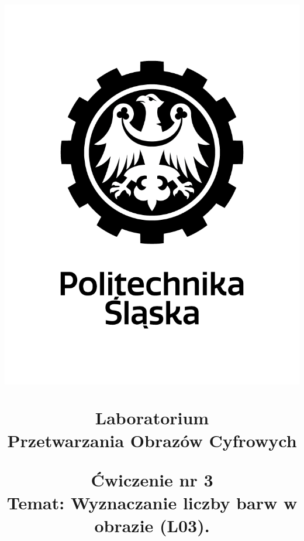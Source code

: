 \title{
\centering

\vspace{-5.0cm} %

\begin{flushright}
    \includegraphics[scale = 0.2, trim={0 0 4.6cm 0}, clip]{./../src/logo/pl/polsl_logo.png}\\ %
\end{flushright}

\vspace*{2.7cm} %

{\fontsize{24}{30}\selectfont\textbf{Laboratorium \\
Przetwarzania Obrazów Cyfrowych}}\\
\vspace*{4.2cm}

{\fontsize{14}{0}\selectfont 
Ćwiczenie nr 3 \\[-1.2em] 
Temat: Wyznaczanie liczby barw w obrazie (L03).
}
\vspace*{4.2cm} %
}
